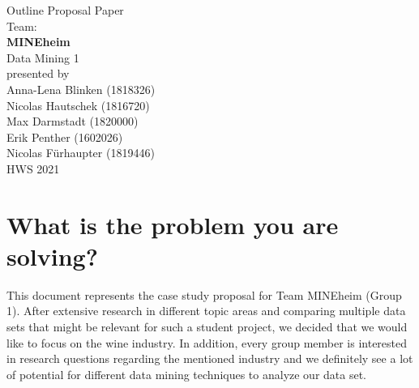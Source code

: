 \documentclass[11pt,titlepage,oneside,openany]{article}
\begin{document}
\begin{titlepage}
	\vspace*{2cm}
  \begin{center}
   {\Large Outline Proposal Paper\\}
   \vspace{2cm} 
   {Team:\\}
   {\Large \textbf{MINEheim}\\}
   \vspace{1cm}
   {Data Mining 1\\}
   \vspace{2cm}
   {presented by\\
    Anna-Lena Blinken (1818326)\\
	Nicolas Hautschek (1816720)\\
	Max Darmstadt (1820000)\\
	Erik Penther (1602026)\\
	Nicolas Fürhaupter (1819446)\\
   }
   \vspace{1cm} 
   {HWS 2021}
  \end{center}
\end{titlepage} 






\newpage



\section{What is the problem you are solving?}

This document represents the case study proposal for Team MINEheim (Group 1). After extensive research in different topic areas and comparing multiple data sets that might be relevant for such a student project, we decided that we would like to focus on the wine industry. In addition, every group member is interested in research questions regarding the mentioned industry and we definitely see a lot of potential for different data mining techniques to analyze our data set.
\end{document}
